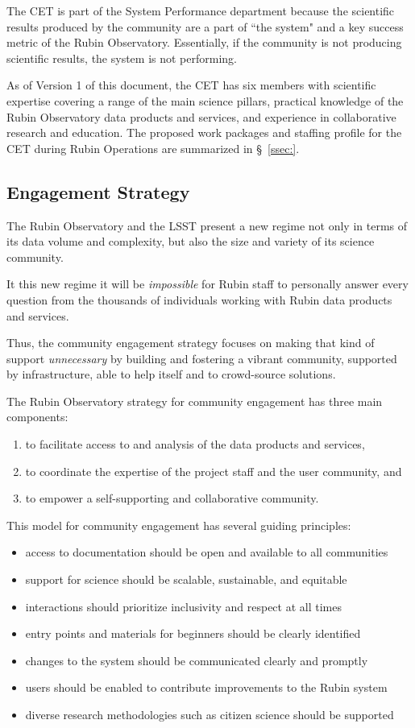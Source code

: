 \documentclass[DM,lsstdraft,toc]{lsstdoc}
\begin{document}
The CET is part of the System Performance department because the scientific results produced by the community are a part of ``the system" and a key success metric of the Rubin Observatory.
Essentially, if the community is not producing scientific results, the system is not performing. 

As of Version 1 of this document, the CET has six members with scientific expertise covering a range of the main science pillars, practical knowledge of the Rubin Observatory data products and services, and experience in collaborative research and education.
The proposed work packages and staffing profile for the CET during Rubin Operations are summarized in \S~\ref{ssec:}.


\subsection{Engagement Strategy}\label{ssec:intro_strat}

The Rubin Observatory and the LSST present a new regime not only in terms of its data volume and complexity, but also the size and variety of its science community.

It this new regime it will be \textit{impossible} for Rubin staff to personally answer every question from the thousands of individuals working with Rubin data products and services.

Thus, the community engagement strategy focuses on making that kind of support \textit{unnecessary} by building and fostering a vibrant community, supported by infrastructure, able to help itself and to crowd-source solutions. 

The Rubin Observatory strategy for community engagement has three main components:
\begin{enumerate}
\item to facilitate access to and analysis of the data products and services,
\item to coordinate the expertise of the project staff and the user community, and
\item to empower a self-supporting and collaborative community.
\end{enumerate}

This model for community engagement has several guiding principles:
\begin{itemize}
\item access to documentation should be open and available to all communities
\item support for science should be scalable, sustainable, and equitable
\item interactions should prioritize inclusivity and respect at all times
\item entry points and materials for beginners should be clearly identified
\item changes to the system should be communicated clearly and promptly
\item users should be enabled to contribute improvements to the Rubin system
\item diverse research methodologies such as citizen science should be supported
\end{itemize}
\end{document}
